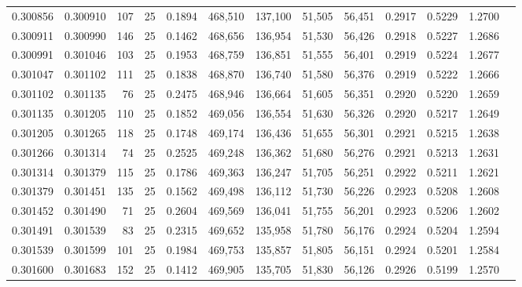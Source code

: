 \begin{tabular}{rrrrrrrrrrrrr}
0.300856 & 0.300910 &   107 &  25 &                                     0.1894 & 468,510 & 137,100 &  51,505 &  56,451 & 0.2917 & 0.5229 & 1.2700 \\
0.300911 & 0.300990 &   146 &  25 &                                     0.1462 & 468,656 & 136,954 &  51,530 &  56,426 & 0.2918 & 0.5227 & 1.2686 \\
0.300991 & 0.301046 &   103 &  25 &                                     0.1953 & 468,759 & 136,851 &  51,555 &  56,401 & 0.2919 & 0.5224 & 1.2677 \\
0.301047 & 0.301102 &   111 &  25 &                                     0.1838 & 468,870 & 136,740 &  51,580 &  56,376 & 0.2919 & 0.5222 & 1.2666 \\
0.301102 & 0.301135 &    76 &  25 &                                     0.2475 & 468,946 & 136,664 &  51,605 &  56,351 & 0.2920 & 0.5220 & 1.2659 \\
0.301135 & 0.301205 &   110 &  25 &                                     0.1852 & 469,056 & 136,554 &  51,630 &  56,326 & 0.2920 & 0.5217 & 1.2649 \\
0.301205 & 0.301265 &   118 &  25 &                                     0.1748 & 469,174 & 136,436 &  51,655 &  56,301 & 0.2921 & 0.5215 & 1.2638 \\
0.301266 & 0.301314 &    74 &  25 &                                     0.2525 & 469,248 & 136,362 &  51,680 &  56,276 & 0.2921 & 0.5213 & 1.2631 \\
0.301314 & 0.301379 &   115 &  25 &                                     0.1786 & 469,363 & 136,247 &  51,705 &  56,251 & 0.2922 & 0.5211 & 1.2621 \\
0.301379 & 0.301451 &   135 &  25 &                                     0.1562 & 469,498 & 136,112 &  51,730 &  56,226 & 0.2923 & 0.5208 & 1.2608 \\
0.301452 & 0.301490 &    71 &  25 &                                     0.2604 & 469,569 & 136,041 &  51,755 &  56,201 & 0.2923 & 0.5206 & 1.2602 \\
0.301491 & 0.301539 &    83 &  25 &                                     0.2315 & 469,652 & 135,958 &  51,780 &  56,176 & 0.2924 & 0.5204 & 1.2594 \\
0.301539 & 0.301599 &   101 &  25 &                                     0.1984 & 469,753 & 135,857 &  51,805 &  56,151 & 0.2924 & 0.5201 & 1.2584 \\
0.301600 & 0.301683 &   152 &  25 &                                     0.1412 & 469,905 & 135,705 &  51,830 &  56,126 & 0.2926 & 0.5199 & 1.2570 \\

\end{tabular}
